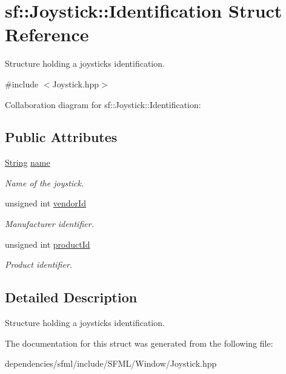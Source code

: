 \hypertarget{structsf_1_1_joystick_1_1_identification}{}\section{sf\+:\+:Joystick\+:\+:Identification Struct Reference}
\label{structsf_1_1_joystick_1_1_identification}


Structure holding a joystick\textquotesingle{}s identification.  




{\ttfamily \#include $<$Joystick.\+hpp$>$}



Collaboration diagram for sf\+:\+:Joystick\+:\+:Identification\+:
\subsection*{Public Attributes}
\begin{DoxyCompactItemize}
\item 
\mbox{\label{structsf_1_1_joystick_1_1_identification_a135a9a3a4dc11c2b5cde51159b4d136d}} 
\hyperlink{classsf_1_1_string}{String} \hyperlink{structsf_1_1_joystick_1_1_identification_a135a9a3a4dc11c2b5cde51159b4d136d}{name}
\begin{DoxyCompactList}\small\item\em Name of the joystick. \end{DoxyCompactList}\item 
\mbox{\label{structsf_1_1_joystick_1_1_identification_a827caf37a56492e3430e5ca6b15b5e9f}} 
unsigned int \hyperlink{structsf_1_1_joystick_1_1_identification_a827caf37a56492e3430e5ca6b15b5e9f}{vendor\+Id}
\begin{DoxyCompactList}\small\item\em Manufacturer identifier. \end{DoxyCompactList}\item 
\mbox{\label{structsf_1_1_joystick_1_1_identification_a18c21317789f51f9a5f132677727ff77}} 
unsigned int \hyperlink{structsf_1_1_joystick_1_1_identification_a18c21317789f51f9a5f132677727ff77}{product\+Id}
\begin{DoxyCompactList}\small\item\em Product identifier. \end{DoxyCompactList}\end{DoxyCompactItemize}


\subsection{Detailed Description}
Structure holding a joystick\textquotesingle{}s identification. 

The documentation for this struct was generated from the following file\+:\begin{DoxyCompactItemize}
\item 
dependencies/sfml/include/\+S\+F\+M\+L/\+Window/Joystick.\+hpp\end{DoxyCompactItemize}
